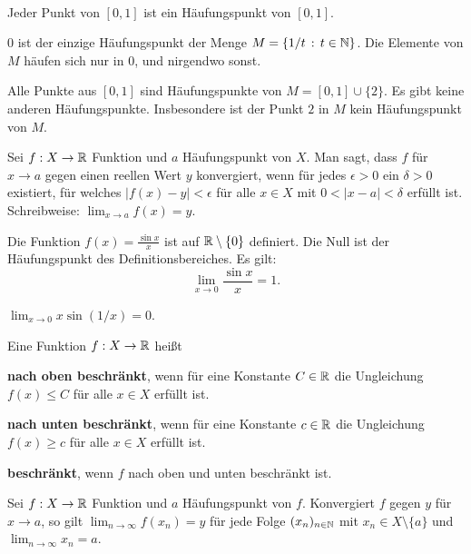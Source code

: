 \begin{bsp} {\ }
	\begin{enuma}
		\item Jeder Punkt von $[0,1]$ ist ein Häufungspunkt von $[0,1]$. 
		\item $0$ ist der einzige Häufungspunkt der Menge $M=\left\{ 1/t \,:\, t \in \mathbb{N} \right\}$. Die Elemente von $M$ häufen sich nur in $0$, und nirgendwo sonst. 
		\item Alle Punkte aus $[0,1]$ sind Häufungspunkte von $M = [0,1] \cup \{2\}$. Es gibt keine anderen Häufungspunkte. Insbesondere ist der Punkt $2$ in $M$ kein Häufungspunkt von $M$. 
	\end{enuma} 
\end{bsp} 

\begin{defn}
	Sei $f : X \to \mathbb{R}$ Funktion und $a$ Häufungspunkt von $X$. Man sagt, dass $f$ für $x \to a$ gegen einen reellen Wert $y$ konvergiert, wenn für jedes $\epsilon>0$ ein $\delta >0$ existiert, für welches $|f(x) -y| < \epsilon$ für alle $x \in X$ mit $0 < |x-a| < \delta$ erfüllt ist. Schreibweise: $\lim_{x \to a} f(x) = y$. 
\end{defn} 

\begin{bsp}
	Die Funktion $f(x) = \frac{\sin x}{x}$ ist auf $\mathbb{R} \setminus \{0\}$ definiert. Die Null ist der Häufungspunkt des Definitionsbereiches. Es gilt: 
	\[
		\lim_{x \to 0} \frac{\sin x}{x} = 1. 
	\]
\end{bsp} 

\begin{bsp}
	$\lim_{x \to 0} x \sin ( 1/x) = 0$. 
\end{bsp} 


\begin{defn}
	Eine Funktion $f : X \to \mathbb{R}$ heißt
	\begin{enuma}
		\item \textbf{nach oben beschränkt}, wenn für eine Konstante $C \in \mathbb{R}$ die Ungleichung $f(x) \le C$ für alle $x \in X$ erfüllt ist. 
		\item \textbf{nach unten beschränkt}, wenn für eine Konstante $c \in \mathbb{R}$ die Ungleichung $f(x) \ge c$ für alle $x \in X$ erfüllt ist. 
		\item \textbf{beschränkt}, wenn $f$ nach oben und unten beschränkt ist. 
	\end{enuma} 
\end{defn} 

\begin{thm}
	Sei $f : X \to \mathbb{R}$ Funktion und $a$ Häufungspunkt von $f$. Konvergiert $f$ gegen $y$ für $x \to a$, so gilt $\lim_{n \to \infty} f(x_n) = y$ für jede Folge $(x_n)_{n \in \mathbb{N}}$ mit $x_n \in X \setminus \{a\}$ und $\lim_{n \to \infty} x_n  = a$. 
\end{thm} 

